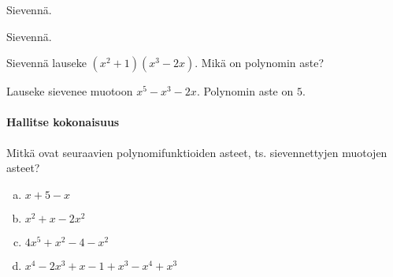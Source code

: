 \begin{tehtavasivu}
\begin{tehtava}
    Sievennä.
    \begin{alakohdat}
    \end{alakohdat}
    \begin{vastaus}
        \begin{alakohdat}
        \end{alakohdat}
    \end{vastaus}
\end{tehtava}

\begin{tehtava}
    Sievennä.
    \begin{alakohdat}
\end{alakohdat}
    \begin{vastaus}
        \begin{alakohdat}
        \end{alakohdat}
    \end{vastaus}
\end{tehtava}

\begin{tehtava}
    Sievennä lauseke $(x^2+1)(x^3-2x)$. Mikä on polynomin aste?
    \begin{vastaus}
        Lauseke sievenee muotoon $x^5-x^3-2x$. Polynomin aste on $5$.
    \end{vastaus}
\end{tehtava}

\paragraph*{Hallitse kokonaisuus}


\begin{tehtava}
	Mitkä ovat seuraavien polynomifunktioiden asteet, ts. sievennettyjen muotojen asteet?
	\begin{enumerate}[a)]
		\item $x+5-x$
		\item $x^2+x-2x^2$
		\item $4x^5+x^2-4-x^2$
		\item $x^4-2x^3+x-1+x^3-x^4+x^3$
	\end{enumerate}


\end{tehtava}
\end{tehtavasivu}
